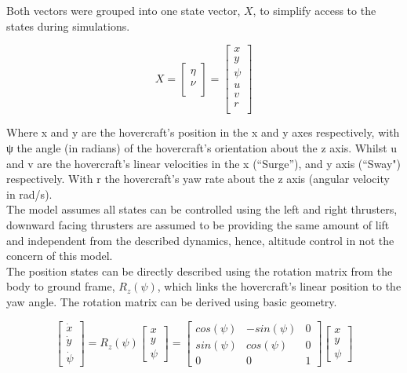 \documentclass[a4paper,12pt]{article}
\begin{document}
Both vectors were grouped into one state vector, \(X\), to simplify access to the states during simulations.

\begin{equation}
X = \begin{bmatrix} \eta\\ \nu\\ \end{bmatrix} = 
    \begin{bmatrix} x\\ y\\ \psi\\ u\\ v\\ r\\ \end{bmatrix}
\end{equation}

Where x and y are the hovercraft’s position in the x and y axes respectively, with ψ the angle (in radians) of the hovercraft’s orientation about the z axis.
Whilst u and v are the hovercraft’s linear velocities in the x (“Surge”), and y axis (“Sway") respectively. With r the hovercraft’s yaw rate about the z axis (angular velocity in rad/s).\\

The model assumes all states can be controlled using the left and right thrusters, downward facing thrusters are assumed to be providing the same amount of lift and independent from the described dynamics, hence, altitude control in not the concern of this model.\\

The position states can be directly described using the rotation matrix from the body to ground frame, \(R_z (\psi)\), which links the hovercraft’s linear position to the yaw angle. The rotation matrix can be derived using basic geometry.

\begin{equation}
    \begin{bmatrix} 
        \dot{x}\\ \dot{y}\\ \dot{\psi} 
    \end{bmatrix} 
    =
    R_z(\psi) 
    \begin{bmatrix} 
        x\\ y\\ \psi 
    \end{bmatrix} 
    =
    \begin{bmatrix} 
        cos(\psi) & -sin(\psi) & 0\\
        sin(\psi) & cos(\psi)  & 0 \\
        0         &     0      & 1 
    \end{bmatrix}
    \begin{bmatrix}
        x\\ y\\ \psi 
    \end{bmatrix}
\end{equation}
\end{document}
